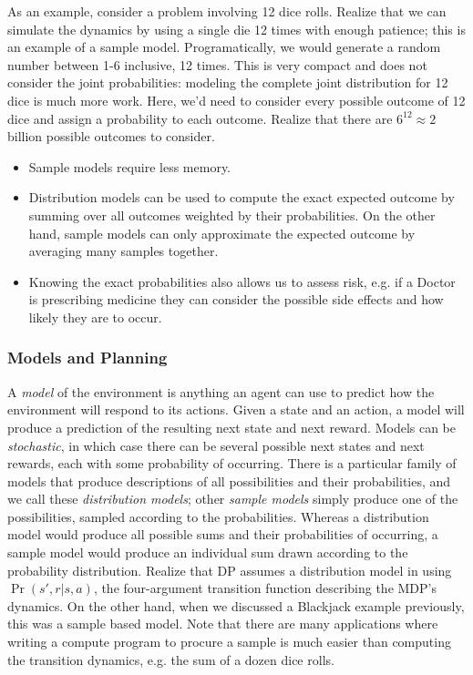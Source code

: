 \documentclass[12pt]{article}
\begin{document}
As an example, consider a problem involving 12 dice rolls. Realize that we can simulate the dynamics by using a single die 12 times with enough patience; this is an example of a sample model. Programatically, we would generate a random number between 1-6 inclusive, 12 times. This is very compact and does not consider the joint probabilities: modeling the complete joint distribution for 12 dice is much more work. Here, we'd need to consider every possible outcome of 12 dice and assign a probability to each outcome. Realize that there are $6^{12}\approx 2$ billion possible outcomes to consider.
\begin{itemize}
\item Sample models require less memory.
\item Distribution models can be used to compute the exact expected outcome by summing over all outcomes weighted by their probabilities. On the other hand, sample models can only approximate the expected outcome by averaging many samples together.
\item Knowing the exact probabilities also allows us to assess risk, e.g. if a Doctor is prescribing medicine they can consider the possible side effects and how likely they are to occur.
\end{itemize}
\subsubsection{Models and Planning} A \emph{model} of the environment is anything an agent can use to predict how the environment will respond to its actions. Given a state and an action, a model will produce a prediction of the resulting next state and next reward. Models can be \emph{stochastic}, in which case there can be several possible next states and next rewards, each with some probability of occurring. There is a particular family of models that produce descriptions of all possibilities and their probabilities, and we call these \emph{distribution models}; other \emph{sample models} simply produce one of the possibilities, sampled according to the probabilities. Whereas a distribution model would produce all possible sums and their probabilities of occurring, a sample model would produce an individual sum drawn according to the probability distribution. Realize that DP assumes a distribution model in using $\Pr(s',r|s,a)$, the four-argument transition function describing the MDP's dynamics. On the other hand, when we discussed a Blackjack example previously, this was a sample based model. Note that there are many applications where writing a compute program to procure a sample is much easier than computing the transition dynamics, e.g. the sum of a dozen dice rolls.
\end{document}
